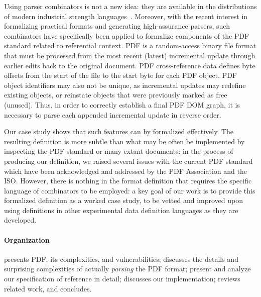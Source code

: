 Using parser combinators is not a new idea: they are available in the
distributions of modern industrial strength
languages~\cite{leijen2001parsec,couprie2015nom,mundkurResearchReportParsley2020,bratus2017curing,willis2020staged}.
%
Moreover, with the recent interest in formalizing practical formats
and generating high-assurance parsers, such combinators have
specifically been applied to formalize components of the
PDF standard related to referential context.
%
PDF is a random-access binary file format
that must be processed from the most recent (latest) incremental
update through earlier edits back to the original document.
%
PDF cross-reference data defines byte offsets from the start of the
file to the start byte for each PDF object. PDF object identifiers may
also not be unique, as incremental updates may redefine existing
objects, or reinstate objects that were previously marked as free
(unused).
%
Thus, in order to correctly establish a final PDF DOM graph, it is
necessary to parse each appended incremental update in reverse
order.

Our case study shows that such features can by formalized effectively.
%
The resulting definition is more subtle than what may be often be
implemented by inspecting the PDF standard or many extant documents:
in the process of producing our definition, we raised several issues
with the current PDF standard which have been acknowledged and
addressed by the PDF Association and the ISO.
%
However, there is nothing in the format definition that requires the
specific language of combinators to be employed: a key goal of our work is
to provide this formalized definition as a worked case study, to be
vetted and improved upon using definitions in other experimental data
definition languages as they are developed.

\paragraph*{Organization}
%
 presents PDF, its complexities, and vulnerabilities;
%
 discusses the details and surprising
complexities of actually \emph{parsing} the PDF format;
%
 present and analyze our
specification of reference in detail;
%
 discusses our implementation;
%
 reviews related work, and %
 concludes.

